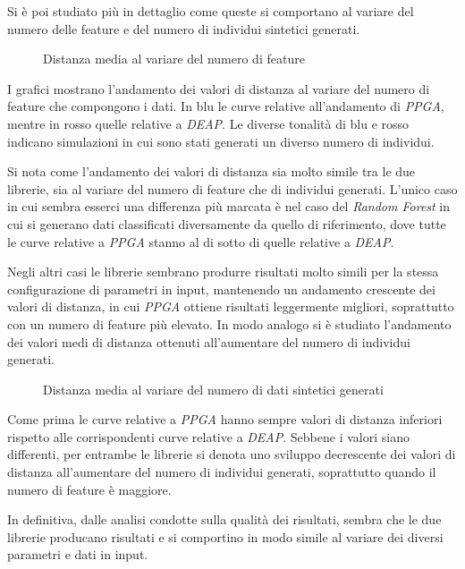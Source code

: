 Si è poi studiato più in dettaglio come queste si comportano al variare del
numero delle feature e del numero di individui sintetici generati.

\begin{figure}[H]
	\centering
	
	\caption{Distanza media al variare del numero di feature}
	\label{fig: quality_feature}
\end{figure}

I grafici mostrano l'andamento dei valori di distanza al variare del numero di
feature che compongono i dati. In blu le curve relative all'andamento di
\textit{PPGA}, mentre in rosso quelle relative a \textit{DEAP}. Le diverse
tonalità di blu e rosso indicano simulazioni in cui sono stati generati un
diverso numero di individui.

Si nota come l'andamento dei valori di distanza sia molto simile tra le due
librerie, sia al variare del numero di feature che di individui generati.
L'unico caso in cui sembra esserci una differenza più marcata è nel caso del
\textit{Random Forest} in cui si generano dati classificati diversamente da
quello di riferimento, dove tutte le curve relative a \textit{PPGA} stanno al
di sotto di quelle relative a \textit{DEAP}.

Negli altri casi le librerie sembrano produrre risultati molto simili per la
stessa configurazione di parametri in input, mantenendo un andamento crescente
dei valori di distanza, in cui \textit{PPGA} ottiene risultati leggermente
migliori, soprattutto con un numero di feature più elevato. In modo analogo si
è studiato l'andamento dei valori medi di distanza ottenuti all'aumentare del
numero di individui generati.

\begin{figure}[H]
	\centering
	
	\caption{Distanza media al variare del numero di dati sintetici generati}
	\label{fig: quality_pop}
\end{figure}

Come prima le curve relative a \textit{PPGA} hanno sempre valori di distanza
inferiori rispetto alle corrispondenti curve relative a \textit{DEAP}. Sebbene
i valori siano differenti, per entrambe le librerie si denota uno sviluppo
decrescente dei valori di distanza all'aumentare del numero di individui
generati, soprattutto quando il numero di feature è maggiore.

In definitiva, dalle analisi condotte sulla qualità dei risultati, sembra che
le due librerie producano risultati e si comportino in modo simile al variare
dei diversi parametri e dati in input.
